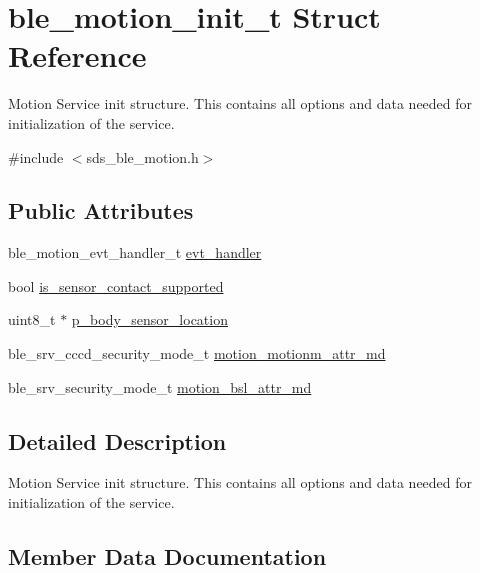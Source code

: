 \hypertarget{structble__motion__init__t}{}\section{ble\+\_\+motion\+\_\+init\+\_\+t Struct Reference}
\label{structble__motion__init__t}


Motion Service init structure. This contains all options and data needed for initialization of the service.  




{\ttfamily \#include $<$sds\+\_\+ble\+\_\+motion.\+h$>$}

\subsection*{Public Attributes}
\begin{DoxyCompactItemize}
\item 
ble\+\_\+motion\+\_\+evt\+\_\+handler\+\_\+t \mbox{\hyperlink{structble__motion__init__t_a0da970014701e383ba7b029169ce6d25}{evt\+\_\+handler}}
\item 
bool \mbox{\hyperlink{structble__motion__init__t_af686b9dc2dcb378cba8b706c568efe5b}{is\+\_\+sensor\+\_\+contact\+\_\+supported}}
\item 
uint8\+\_\+t $\ast$ \mbox{\hyperlink{structble__motion__init__t_a6a7d65af831d1d0d9d1714a0b1d657a0}{p\+\_\+body\+\_\+sensor\+\_\+location}}
\item 
ble\+\_\+srv\+\_\+cccd\+\_\+security\+\_\+mode\+\_\+t \mbox{\hyperlink{structble__motion__init__t_af03b60189a9fdd88ff02b82aa6e653e0}{motion\+\_\+motionm\+\_\+attr\+\_\+md}}
\item 
ble\+\_\+srv\+\_\+security\+\_\+mode\+\_\+t \mbox{\hyperlink{structble__motion__init__t_acdeec7610f03da5c0a0e2bc7252ab401}{motion\+\_\+bsl\+\_\+attr\+\_\+md}}
\end{DoxyCompactItemize}


\subsection{Detailed Description}
Motion Service init structure. This contains all options and data needed for initialization of the service. 

\subsection{Member Data Documentation}
\mbox{\label{structble__motion__init__t_a0da970014701e383ba7b029169ce6d25}} 
